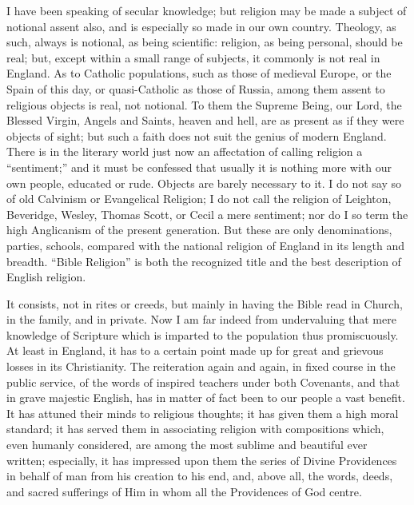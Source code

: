 I have been speaking of secular knowledge; but religion may be made
a subject of notional assent also, and is especially so made in our
own country. Theology, as such, always is notional, as being
scientific: religion, as being personal, should be real; but, except
within a small range of subjects, it commonly is not real in England.
As to Catholic populations, such as those of medieval Europe, or the
Spain of this day, or quasi-Catholic as those of Russia, among them
assent to religious objects is real, not notional. To them the Supreme
Being, our Lord, the Blessed Virgin, Angels and Saints, heaven and
hell, are as present as if they were objects of sight; but such a
faith does not suit the genius of modern England. There is in the
literary world just now an affectation of calling religion a
``sentiment;'' and it must be confessed that usually it is
nothing more with our own people, educated or rude. Objects are barely
necessary to it. I do not say so of old Calvinism or Evangelical
Religion; I do not call the religion of Leighton, Beveridge, Wesley,
Thomas Scott, or Cecil a mere sentiment; nor do I so term the high
Anglicanism of the present generation. But these are only
denominations, parties, schools, compared with the national religion
of England in its length and breadth. ``Bible Religion'' is
both the recognized title and the best description of English
religion.

It consists, not in rites or creeds, but mainly in having the Bible
read in Church, in the family, and in private. Now I am far indeed
from undervaluing that mere knowledge of Scripture which is imparted
to the population thus promiscuously. At least in England, it has to a
certain point made up for great and grievous losses in its
Christianity. The reiteration again and again, in fixed course in the
public service, of the words of inspired teachers under both
Covenants, and that in grave majestic English, has in matter of fact
been to our people a vast benefit. It has attuned their minds to
religious thoughts; it has given them a high moral standard; it has
served them in associating religion with compositions which, even
humanly considered, are among the most sublime and beautiful ever
written; especially, it has impressed upon them the series of Divine
Providences in behalf of man from his creation to his end, and,
above all, the words, deeds, and sacred sufferings of Him in whom all
the Providences of God centre.


